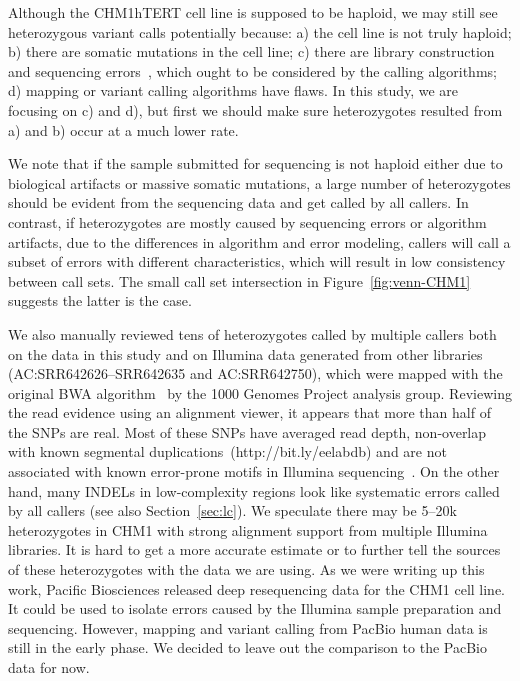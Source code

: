 \documentclass{bioinfo}
\begin{document}
Although the CHM1hTERT cell line is supposed to be haploid, we may still see
heterozygous variant calls potentially because: a) the cell line is not truly
haploid; b) there are somatic mutations in the cell line; c) there are
library construction and sequencing errors~\citep{Robasky:2014aa}, which ought
to be considered by the calling algorithms; d) mapping or variant calling
algorithms have flaws. In this study, we are focusing on c) and d), but first
we should make sure heterozygotes resulted from a) and b) occur at a much lower
rate.

We note that if the sample submitted for sequencing is not haploid either due
to biological artifacts or massive somatic mutations, a large number of
heterozygotes should be evident from the sequencing data and get called by all
callers. In contrast, if heterozygotes are mostly caused by sequencing errors
or algorithm artifacts, due to the differences in algorithm and error modeling,
callers will call a subset of errors with different characteristics, which will
result in low consistency between call sets. The small call set intersection in
Figure~\ref{fig:venn-CHM1} suggests the latter is the case.

We also manually reviewed tens of heterozygotes called by multiple callers both
on the data in this study and on Illumina data generated from other libraries
(AC:SRR642626--SRR642635 and AC:SRR642750), which were mapped with the original BWA
algorithm~\citep{Li:2009uq} by the 1000 Genomes Project analysis group.
Reviewing the read evidence using an alignment viewer, it appears that more than half of the SNPs are real.
Most of these SNPs have averaged read depth, non-overlap with known segmental duplications~(http://bit.ly/eelabdb)
and are not associated with known error-prone motifs in Illumina sequencing~\citep{Nakamura:2011aa}.
On the other hand, many INDELs in low-complexity regions look like systematic errors called by
all callers (see also Section~\ref{sec:lc}).  We speculate there may be 5--20k
heterozygotes in CHM1 with strong alignment support from multiple Illumina
libraries. It is hard to get a more accurate estimate or to further tell the
sources of these heterozygotes with the data we are using. As we were writing up
this work, Pacific Biosciences released deep resequencing data for the CHM1
cell line. It could be used to isolate errors caused by the Illumina
sample preparation and sequencing. However, mapping and variant calling from
PacBio human data is still in the early phase. We decided to leave out the comparison
to the PacBio data for now.
\end{document}
